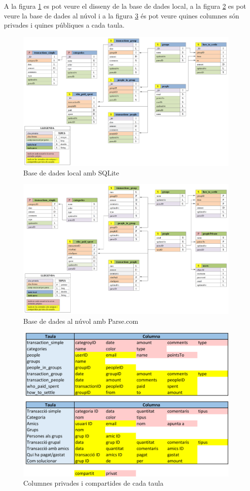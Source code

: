 A la figura \ref{fig:db_sqlite} es pot veure el disseny de la base de dades local, a la figura \ref{fig:db_parse} es pot veure la base de dades al núvol i a la figura \ref{fig:db_private_shared} és pot veure quines columnes són privades i quines públiques a cada taula. 

\begin{figure}[ht]
\centering
\includegraphics[scale=0.44]{db_sqlite.png}
\caption{Base de dades local amb SQLite}\label{fig:db_sqlite}
\end{figure}

\begin{figure}[ht]
\centering
\includegraphics[scale=0.44]{db_parse.png}
\caption{Base de dades al núvol amb Parse.com}\label{fig:db_parse}
\end{figure}

\begin{figure}[ht]
\centering
\includegraphics[scale=0.8]{db_private_shared.png}
\caption{Columnes privades i compartides de cada taula}\label{fig:db_private_shared}
\end{figure}
